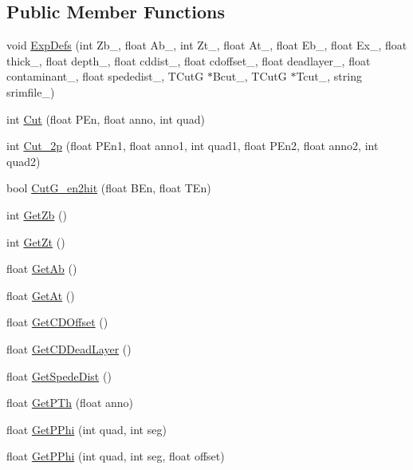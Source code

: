 \subsection*{Public Member Functions}
\begin{DoxyCompactItemize}
\item 
void \hyperlink{classdoppler_aec4f49113b347c342672485368b2ad8c}{Exp\+Defs} (int Zb\+\_\+, float Ab\+\_\+, int Zt\+\_\+, float At\+\_\+, float Eb\+\_\+, float Ex\+\_\+, float thick\+\_\+, float depth\+\_\+, float cddist\+\_\+, float cdoffset\+\_\+, float deadlayer\+\_\+, float contaminant\+\_\+, float spededist\+\_\+, T\+CutG $\ast$Bcut\+\_\+, T\+CutG $\ast$Tcut\+\_\+, string srimfile\+\_\+)
\item 
int \hyperlink{classdoppler_aa3debb227d73f7cdea5b02e4c202cb19}{Cut} (float P\+En, float anno, int quad)
\item 
int \hyperlink{classdoppler_a52f116733da78465469a75ced66915a8}{Cut\+\_\+2p} (float P\+En1, float anno1, int quad1, float P\+En2, float anno2, int quad2)
\item 
bool \hyperlink{classdoppler_a56df9f9384f469385458193754c743c9}{Cut\+G\+\_\+en2hit} (float B\+En, float T\+En)
\item 
int \hyperlink{classdoppler_a29e9a1565d90df9f5d9deef05cdbf53c}{Get\+Zb} ()
\item 
int \hyperlink{classdoppler_ac0587ca2b963edec86d17dd6dac024ce}{Get\+Zt} ()
\item 
float \hyperlink{classdoppler_a364b85a1e3be8f5386dab5f0b6fe2da3}{Get\+Ab} ()
\item 
float \hyperlink{classdoppler_aef253058a4cae5ab5c6b2662d6afb39d}{Get\+At} ()
\item 
float \hyperlink{classdoppler_ac7725720fab82af5a5a6f02041bc9483}{Get\+C\+D\+Offset} ()
\item 
float \hyperlink{classdoppler_a2c1aef6db4ad3fc0c98e91d995992706}{Get\+C\+D\+Dead\+Layer} ()
\item 
float \hyperlink{classdoppler_ae45abdba9f375009cdeba5ac81d7b32c}{Get\+Spede\+Dist} ()
\item 
float \hyperlink{classdoppler_a1415bdb47dbb9d5eba7f14a64bd3693e}{Get\+P\+Th} (float anno)
\item 
float \hyperlink{classdoppler_a0f57a8f4a8c369c14d52e62dd3833f2e}{Get\+P\+Phi} (int quad, int seg)
\item 
float \hyperlink{classdoppler_ac8f059cc77214a954be534a85c748a3c}{Get\+P\+Phi} (int quad, int seg, float offset)
\item 

\end{DoxyCompactItemize}
